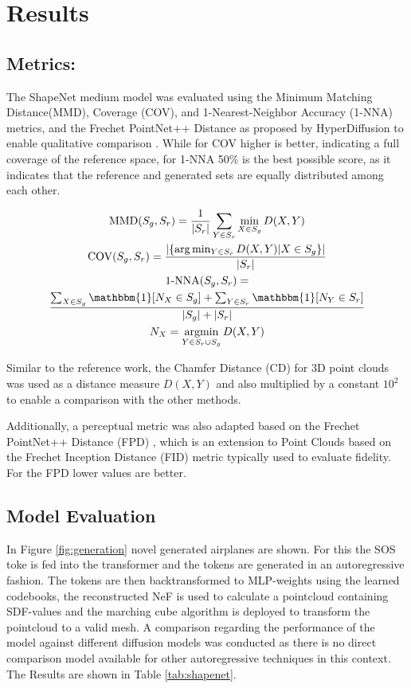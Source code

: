 


\section{Results}

\subsection*{Metrics: }

The ShapeNet medium model was evaluated using the Minimum Matching Distance(MMD), Coverage (COV), and 1-Nearest-Neighbor Accuracy (1-NNA) metrics, and the Frechet PointNet++ Distance as proposed by HyperDiffusion to enable qualitative comparison \cite{erkoç2023hyperdiffusion}.
While for COV higher is better, indicating a full coverage of the reference space, for 1-NNA 50\% is the best possible score, as it indicates that the reference and generated sets are equally distributed among each other.

\begin{gather*}
  \mathrm{MMD}(S_g,S_r) =\frac{1}{|S_{r}|}\sum_{Y\in S_{r}}\min_{X\in S_{g}}D(X,Y)\\
  \text{COV}(S_g,S_r) =\frac{|\{\arg\min_{Y\in S_r}D(X,Y)|X\in S_g\}|}{|S_r|}\\
  \text{1-NNA}(S_g,S_r) =\\
  \frac{\sum_{X\in S_g}\mathbbm{1}[N_X\in S_g]+\sum_{Y\in S_r}\mathbbm{1}[N_Y\in S_r]}{|S_g|+|S_r|}\\
  N_X = \underset{Y\in S_r \cup S_g}{\text{argmin}} \, D(X,Y) \\
\end{gather*}

Similar to the reference work, the Chamfer Distance (CD) for 3D point clouds was used as a distance measure $D(X, Y)$ and also multiplied by a constant $10^2$ to enable a comparison with the other methods.

Additionally, a perceptual metric was also adapted based on the Frechet PointNet++ Distance (FPD) \cite{qi2017pointnetdeephierarchicalfeature}, which is an extension to Point Clouds based on the Frechet Inception Distance (FID) metric \cite{NIPS2017_8a1d6947} typically used to evaluate fidelity. For the FPD lower values are better.

\subsection*{Model Evaluation}
In Figure \ref{fig:generation} novel generated airplanes are shown. For this the SOS toke is fed into the transformer and the tokens are generated in an autoregressive fashion. The tokens are then backtransformed to MLP-weights using the learned codebooks, the reconstructed NeF is used to calculate a pointcloud containing SDF-values and the marching cube algorithm is deployed to transform the pointcloud to a valid mesh.
A comparison regarding the performance of the model against different diffusion models was conducted as there is no direct comparison model available for other autoregressive techniques in this context. The Results are shown in Table \ref{tab:shapenet}.

